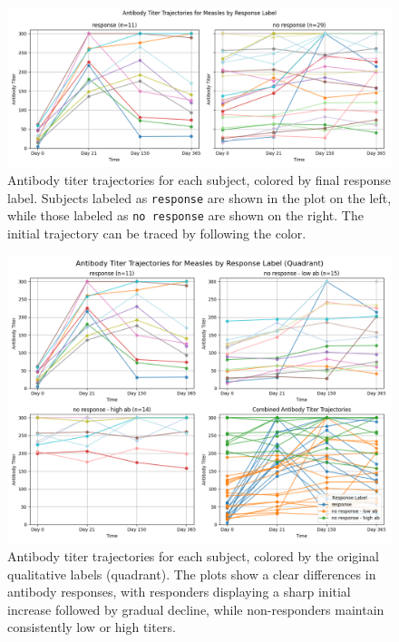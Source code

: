 \documentclass[12pt,a4paper]{report}
\begin{document}
\begin{figure}[H]
\centering
\hspace*{-1cm}
\includegraphics[width=1.1\textwidth]{images/Antibody_Titer_Trajectories_for_Measles_by_Response_Label.png}
\caption[Antibody Titer Trajectories by Response Label]{Antibody titer trajectories for each subject, colored by final response label. Subjects labeled as \texttt{response} are shown in the plot on the left, while those labeled as \texttt{no response} are shown on the right.  The initial trajectory can be traced by following the color.}
\label{fig:titer_response_label}
\end{figure}

\begin{figure}[H]
\centering
\hspace*{-1cm}
\includegraphics[width=1.1\textwidth]{images/Antibody_Titer_Trajectories_for_Measles_by_Original_Label_(Quadrant).png}
\caption[Antibody Titer Trajectories by Original Label (Quadrant)]{Antibody titer trajectories for each subject, colored by the original qualitative labels (quadrant). The plots show a clear differences in antibody responses, with responders displaying a sharp initial increase followed by gradual decline, while non-responders maintain consistently low or high titers.}
\label{fig:titer_original_label}
\end{figure}
\end{document}
